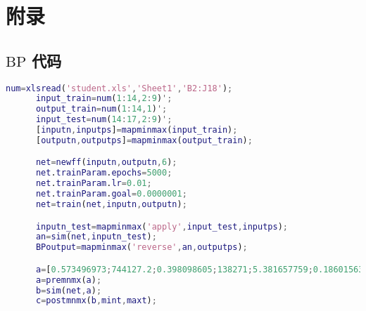 \section{附录}
  \subsection{$\mathrm{BP}$ 代码}
    \lstset{
      columns=flexible,
      numbers=left,
      numberstyle=\footnotesize,
      basicstyle=\sffamily,
      keywordstyle=\bfseries,
      commentstyle=\rmfamily\itshape,
      stringstyle=\ttfamily
    }
    \begin{lstlisting}[language=MATLAB]
      num=xlsread('student.xls','Sheet1','B2:J18');
      input_train=num(1:14,2:9)';
      output_train=num(1:14,1)';
      input_test=num(14:17,2:9)';
      [inputn,inputps]=mapminmax(input_train);
      [outputn,outputps]=mapminmax(output_train);

      net=newff(inputn,outputn,6);
      net.trainParam.epochs=5000;
      net.trainParam.lr=0.01;
      net.trainParam.goal=0.0000001;
      net=train(net,inputn,outputn);

      inputn_test=mapminmax('apply',input_test,inputps);
      an=sim(net,inputn_test);
      BPoutput=mapminmax('reverse',an,outputps);

      a=[0.573496973;744127.2;0.398098605;138271;5.381657759;0.186015634;1.886403068;0.585678094];
      a=premnmx(a);
      b=sim(net,a);
      c=postmnmx(b,mint,maxt);
    \end{lstlisting}

